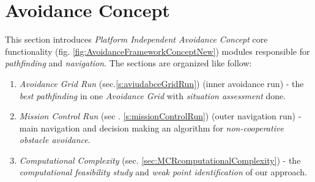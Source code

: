 \cleardoublepage
\section{Avoidance Concept}\label{s:avoidanceConcept}
\noindent This section introduces \emph{Platform Independent Avoidance Concept} core functionality (fig. \ref{fig:AvoidanceFrameworkConceptNew}) modules responsible for \emph{pathfinding} and \emph{navigation}. The sections are organized like follow:

\begin{enumerate}
    
    \item \emph{Avoidance Grid Run} (sec.\ref{s:aviudabceGridRun}) (inner avoidance run) - the \emph{best pathfinding} in one \emph{Avoidance Grid} with \emph{situation assessment} done.
    
    \item \emph{Mission Control Run} (sec . \ref{s:missionControlRun}) (outer navigation run) - main navigation and decision making an algorithm for \emph{non-cooperative obstacle avoidance}.
    
    \item \emph{Computational Complexity} (sec. \ref{sec:MCRcomputationalComplexity}) - the \emph{computational feasibility study} and \emph{weak point identification} of our approach.
    
\end{enumerate}

